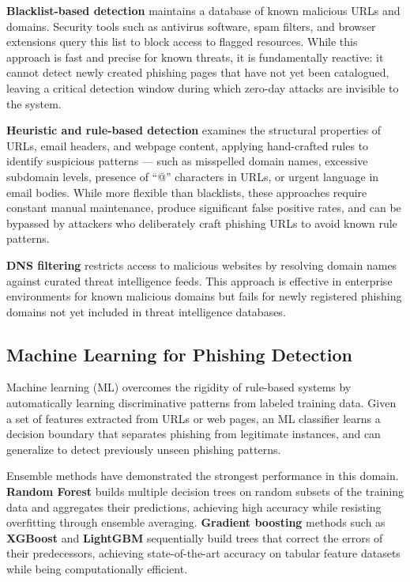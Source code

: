 \textbf{Blacklist-based detection} maintains a database of known malicious URLs and domains. Security tools such as antivirus software, spam filters, and browser extensions query this list to block access to flagged resources. While this approach is fast and precise for known threats, it is fundamentally reactive: it cannot detect newly created phishing pages that have not yet been catalogued, leaving a critical detection window during which zero-day attacks are invisible to the system.

\textbf{Heuristic and rule-based detection} examines the structural properties of URLs, email headers, and webpage content, applying hand-crafted rules to identify suspicious patterns — such as misspelled domain names, excessive subdomain levels, presence of ``@'' characters in URLs, or urgent language in email bodies. While more flexible than blacklists, these approaches require constant manual maintenance, produce significant false positive rates, and can be bypassed by attackers who deliberately craft phishing URLs to avoid known rule patterns.

\textbf{DNS filtering} restricts access to malicious websites by resolving domain names against curated threat intelligence feeds. This approach is effective in enterprise environments for known malicious domains but fails for newly registered phishing domains not yet included in threat intelligence databases.

\subsection{Machine Learning for Phishing Detection}

Machine learning (ML) overcomes the rigidity of rule-based systems by automatically learning discriminative patterns from labeled training data. Given a set of features extracted from URLs or web pages, an ML classifier learns a decision boundary that separates phishing from legitimate instances, and can generalize to detect previously unseen phishing patterns.

Ensemble methods have demonstrated the strongest performance in this domain. \textbf{Random Forest} builds multiple decision trees on random subsets of the training data and aggregates their predictions, achieving high accuracy while resisting overfitting through ensemble averaging. \textbf{Gradient boosting} methods such as \textbf{XGBoost} and \textbf{LightGBM} sequentially build trees that correct the errors of their predecessors, achieving state-of-the-art accuracy on tabular feature datasets while being computationally efficient.

